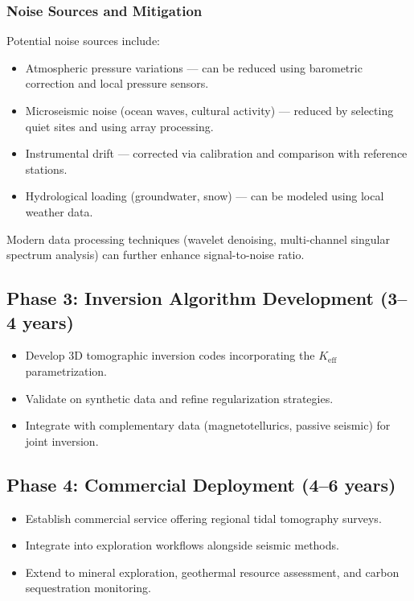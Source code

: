 \documentclass[12pt,a4paper]{article}
\theoremstyle{remark}
\newcommand{\Keff}{K_{\mathrm{eff}}}
\begin{document}
	\subsubsection{Noise Sources and Mitigation}
	
	Potential noise sources include:
	\begin{itemize}
		\item Atmospheric pressure variations — can be reduced using barometric correction and local pressure sensors.
		\item Microseismic noise (ocean waves, cultural activity) — reduced by selecting quiet sites and using array processing.
		\item Instrumental drift — corrected via calibration and comparison with reference stations.
		\item Hydrological loading (groundwater, snow) — can be modeled using local weather data.
	\end{itemize}
	
	Modern data processing techniques (wavelet denoising, multi-channel singular spectrum analysis) can further enhance signal-to-noise ratio.
	
	\subsection{Phase 3: Inversion Algorithm Development (3–4 years)}
	
	\begin{itemize}
		\item Develop 3D tomographic inversion codes incorporating the $\Keff$ parametrization.
		\item Validate on synthetic data and refine regularization strategies.
		\item Integrate with complementary data (magnetotellurics, passive seismic) for joint inversion.
	\end{itemize}
	
	\subsection{Phase 4: Commercial Deployment (4–6 years)}
	
	\begin{itemize}
		\item Establish commercial service offering regional tidal tomography surveys.
		\item Integrate into exploration workflows alongside seismic methods.
		\item Extend to mineral exploration, geothermal resource assessment, and carbon sequestration monitoring.
	\end{itemize}
	
\end{document}
